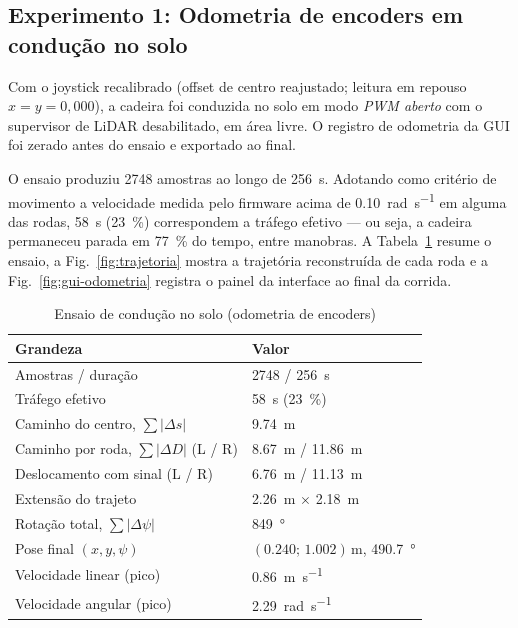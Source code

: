 \documentclass[conference]{IEEEtran}
\begin{document}
\subsection{Experimento 1: Odometria de encoders em condução no solo}

Com o joystick recalibrado (offset de centro reajustado; leitura em repouso
$x=y=0{,}000$), a cadeira foi conduzida no solo em modo \emph{PWM aberto} com o
supervisor de LiDAR desabilitado, em área livre. O registro de odometria da GUI
foi zerado antes do ensaio e exportado ao final.

O ensaio produziu \num{2748} amostras ao longo de \SI{256}{\second}. Adotando
como critério de movimento a velocidade medida pelo firmware acima de
\SI{0.10}{\radian\per\second} em alguma das rodas, \SI{58}{\second}
(\SI{23}{\percent}) correspondem a tráfego efetivo --- ou seja, a cadeira
permaneceu parada em \SI{77}{\percent} do tempo, entre manobras. A
Tabela~\ref{tab:run} resume o ensaio, a Fig.~\ref{fig:trajetoria} mostra a
trajetória reconstruída de cada roda e a Fig.~\ref{fig:gui-odometria} registra o
painel da interface ao final da corrida.

\begin{table}[!t]
\caption{Ensaio de condução no solo (odometria de encoders)}
\label{tab:run}
\centering
\footnotesize
\renewcommand{\arraystretch}{1.2}
\begin{tabular}{@{}p{}p{}@{}}
\hline
\textbf{Grandeza} & \textbf{Valor} \\
\hline
Amostras / duração            & \num{2748} / \SI{256}{\second} \\
Tráfego efetivo               & \SI{58}{\second} (\SI{23}{\percent}) \\
Caminho do centro, $\sum|\Delta s|$ & \SI{9.74}{\metre} \\
Caminho por roda, $\sum|\Delta D|$ (L / R) & \SI{8.67}{\metre} / \SI{11.86}{\metre} \\
Deslocamento com sinal (L / R) & \SI{6.76}{\metre} / \SI{11.13}{\metre} \\
Extensão do trajeto           & \SI{2.26}{\metre} $\times$ \SI{2.18}{\metre} \\
Rotação total, $\sum|\Delta\psi|$ & \SI{849}{\degree} \\
Pose final $(x,y,\psi)$       & $(\num{0.240};\, \num{1.002})\,$m, \SI{490.7}{\degree} \\
Velocidade linear (pico)      & \SI{0.86}{\metre\per\second} \\
Velocidade angular (pico)     & \SI{2.29}{\radian\per\second} \\
\hline
\end{tabular}
\end{table}
\end{document}
